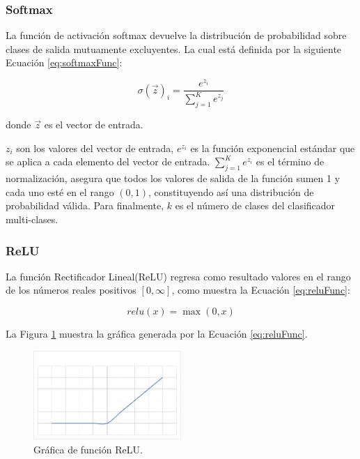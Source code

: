 \subsubsection{Softmax}

La función de activación softmax devuelve la distribución de probabilidad sobre clases de salida mutuamente excluyentes. La cual está definida por la siguiente Ecuación \ref{eq:softmaxFunc}:

\begin{equation}
\label{eq:softmaxFunc}
  \sigma(\overrightarrow{z})_{i}=\frac{e^{z_{i}}}{
    \displaystyle\sum\limits_{j=1}^K e^{z_{j}}
  }
\end{equation}

donde $\overrightarrow{z}$ es el vector de entrada.

$z_i$ son los valores del vector de entrada, $e^{z_{i}}$ es la función exponencial estándar que se aplica a cada elemento del vector de entrada. $\displaystyle\sum\limits_{j=1}^K e^{z_{i}}$ es el término de normalización, asegura que todos los valores de salida de la función sumen 1 y cada uno esté en el rango $(0, 1)$, constituyendo así una distribución de probabilidad válida. Para finalmente, $k$ es el número de clases del clasificador multi-clases.

\subsubsection{ReLU}

La función Rectificador Lineal(ReLU) regresa como resultado valores en el rango de los números reales positivos $[0, \infty]$, como muestra la Ecuación \ref{eq:reluFunc}:

\begin{equation}
\label{eq:reluFunc}
  relu(x)=\max(0,x)
\end{equation}

La Figura \ref{fig:graficaReLU} muestra la gráfica generada por la Ecuación \ref{eq:reluFunc}.

\begin{figure}[H]
    \centering
    \includegraphics[width=0.5\textwidth]{MarcoTeorico/imgs/GraficaReLU.jpg}
    \caption{Gráfica de función ReLU.}
    \label{fig:graficaReLU}
\end{figure}

